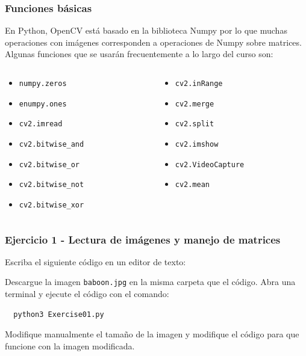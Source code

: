 \begin{frame}\frametitle{Funciones básicas}
  En Python, OpenCV está basado en la biblioteca Numpy por lo que muchas operaciones con imágenes corresponden a operaciones de Numpy sobre matrices.
  Algunas funciones que se usarán frecuentemente a lo largo del curso son:
  \begin{columns}
    \begin{column}{0.5\textwidth}
      \begin{itemize}
      \item \texttt{numpy.zeros}
      \item \texttt{enumpy.ones}
      \item \texttt{cv2.imread}
      \item \texttt{cv2.bitwise\_and}
      \item \texttt{cv2.bitwise\_or}
      \item \texttt{cv2.bitwise\_not}
      \item \texttt{cv2.bitwise\_xor}
      \end{itemize}
    \end{column}
    \begin{column}{0.5\textwidth}
      \begin{itemize}
      \item \texttt{cv2.inRange}
      \item \texttt{cv2.merge}
      \item \texttt{cv2.split}
      \item \texttt{cv2.imshow}
      \item \texttt{cv2.VideoCapture}
      \item \texttt{cv2.mean}
      \end{itemize}
    \end{column}
  \end{columns}
\end{frame}

\begin{frame}[containsverbatim]\frametitle{Ejercicio 1 - Lectura de imágenes y manejo de matrices}
  Escriba el siguiente código en un editor de texto:
  
  Descargue la imagen \texttt{baboon.jpg} en la misma carpeta que el código. Abra una terminal y ejecute el código con el comando:
\begin{verbatim}
  python3 Exercise01.py
\end{verbatim}
  Modifique manualmente el tamaño de la imagen y modifique el código para que funcione con la imagen modificada. 
\end{frame}


